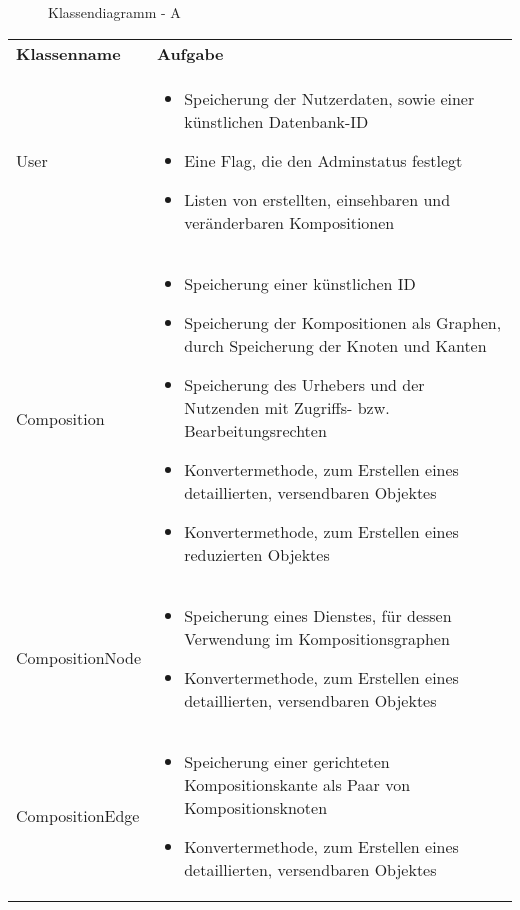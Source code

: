 \makeatletter
\newcommand*{\compress}{\@minipagetrue}
\makeatother

\begin{figure}[h]
	\centering
	\caption{Klassendiagramm - A}
	\label{fig:klassendiagramm-a}
\end{figure}

\begin{table}[h]
	\centering
	\begin{tabularx}{\textwidth}{p{} | X} 
		\rowcolor[HTML]{C0C0C0}
		\textbf{Klassenname} & \textbf{Aufgabe} \\
		User & \compress \begin{itemize}
			\item Speicherung der Nutzerdaten, sowie einer künstlichen Datenbank-ID
			\item Eine Flag, die den Adminstatus festlegt
			\item Listen von erstellten, einsehbaren und veränderbaren Kompositionen
		\end{itemize}\\
		\rowcolor[HTML]{E7E7E7}
		Composition & \compress \begin{itemize}
		  \item Speicherung einer künstlichen ID
			\item Speicherung der Kompositionen als Graphen, durch Speicherung der Knoten und Kanten
			\item Speicherung des Urhebers und der Nutzenden mit Zugriffs- bzw. Bearbeitungsrechten
			\item Konvertermethode, zum Erstellen eines detaillierten, versendbaren Objektes
			\item Konvertermethode, zum Erstellen eines reduzierten Objektes
		\end{itemize} \\
		CompositionNode & \compress \begin{itemize}
			\item Speicherung eines Dienstes, für dessen Verwendung im Kompositionsgraphen
			\item Konvertermethode, zum Erstellen eines detaillierten, versendbaren Objektes
		\end{itemize} \\
		\rowcolor[HTML]{E7E7E7}
		CompositionEdge & \compress \begin{itemize}
			\item Speicherung einer gerichteten Kompositionskante als Paar von Kompositionsknoten
			\item Konvertermethode, zum Erstellen eines detaillierten, versendbaren Objektes

\end{itemize}
\end{tabularx}
\end{table}

